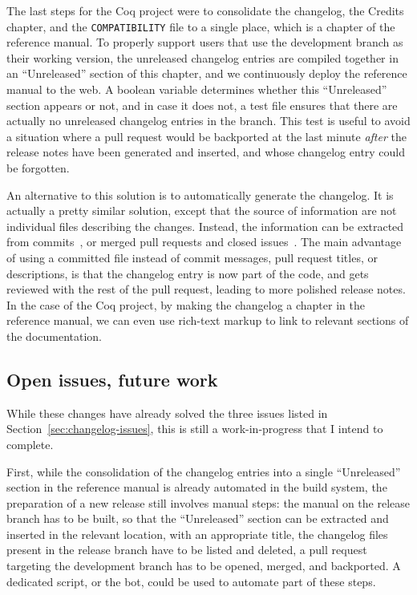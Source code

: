 The last steps for the Coq project were to consolidate the changelog, the Credits chapter, and the \verb|COMPATIBILITY| file to a single place, which is a chapter of the reference manual.
To properly support users that use the development branch as their working version, the unreleased changelog entries are compiled together in an ``Unreleased'' section of this chapter, and we continuously deploy the reference manual to the web.
A boolean variable determines whether this ``Unreleased'' section appears or not, and in case it does not, a test file ensures that there are actually no unreleased changelog entries in the branch.
This test is useful to avoid a situation where a pull request would be backported at the last minute \emph{after} the release notes have been generated and inserted, and whose changelog entry could be forgotten.

An alternative to this solution is to automatically generate the changelog.
It is actually a pretty similar solution, except that the source of information are not individual files describing the changes.
Instead, the information can be extracted from commits~\cite{conventional_changelog}, or merged pull requests and closed issues~\cite{korolev_changelog}.
The main advantage of using a committed file instead of commit messages, pull request titles, or descriptions, is that the changelog entry is now part of the code, and gets reviewed with the rest of the pull request, leading to more polished release notes.
In the case of the Coq project, by making the changelog a chapter in the reference manual, we can even use rich-text markup to link to relevant sections of the documentation.

\subsection{Open issues, future work}

\label{sec:open-issues-changelog}

While these changes have already solved the three issues listed in Section~\ref{sec:changelog-issues}, this is still a work-in-progress that I intend to complete.

First, while the consolidation of the changelog entries into a single ``Unreleased'' section in the reference manual is already automated in the build system, the preparation of a new release still involves manual steps: the manual on the release branch has to be built, so that the ``Unreleased'' section can be extracted and inserted in the relevant location, with an appropriate title, the changelog files present in the release branch have to be listed and deleted, a pull request targeting the development branch has to be opened, merged, and backported.
A dedicated script, or the bot, could be used to automate part of these steps.

